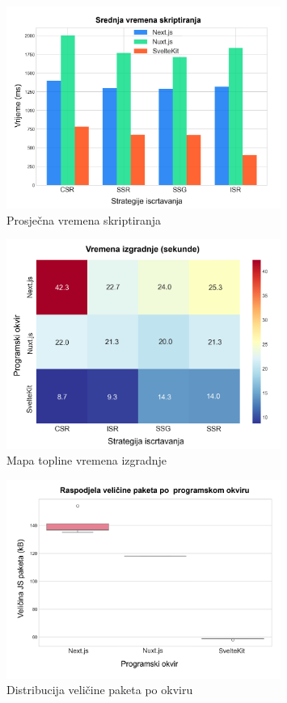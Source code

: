 \begin{figure}[H]
    \centering
    \includegraphics[width=0.8\textwidth]{slike/rezultati/dodatne-metrike/average_scripting_performance_times.png}
    \caption{Prosječna vremena skriptiranja}
    \label{fig:average_scripting_performance_times}
\end{figure}

\begin{figure}[H]
    \centering
    \includegraphics[width=0.8\textwidth]{slike/rezultati/dodatne-metrike/build_times_heat_map.png}
    \caption{Mapa topline vremena izgradnje}
    \label{fig:build_times_heat_map}
\end{figure}


\begin{figure}[H]
    \centering
    \includegraphics[width=0.8\textwidth]{slike/rezultati/dodatne-metrike/bundle_size_distribution_by_framework.png}
    \caption{Distribucija veličine paketa po okviru}
    \label{fig:bundle_size_distribution_by_framework}
\end{figure}

